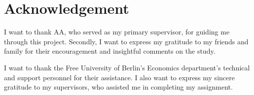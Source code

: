 \section*{Acknowledgement} %
I want to thank AA, who served as my primary supervisor, for guiding me through this project. Secondly, I want to express my gratitude to my friends and family for their encouragement and insightful comments on the study.\par 
I want to thank the Free University of Berlin's Economics department's technical and support personnel for their assistance. I also want to express my sincere gratitude to my supervisors, who assisted me in completing my assignment.





